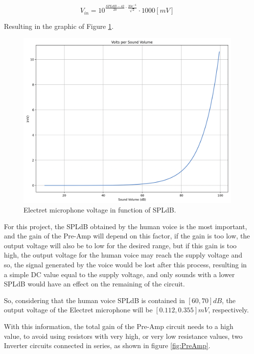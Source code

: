 \begin{equation}
    V_{in} = 10^{\frac{SPLdB-42}{20} \cdot \frac{20e^{-6}}{\sqrt{2}} } \cdot 1000 [mV]
    \label{eq:VoltageSPLdB}
\end{equation}

Resulting in the graphic of Figure \ref{fig:GraphSPLdB}.

\begin{figure}[H]
    \centering
    \includegraphics*[scale = 0.3]{Images/GraphSPLdB.png}
    \caption{Electret microphone voltage in function of SPLdB.}
    \label{fig:GraphSPLdB}
\end{figure}

For this project, the SPLdB obtained by the human voice is the most important, and the gain of the Pre-Amp will depend on this factor, if the gain is too low, the output voltage will also be to low for the desired range, but if this gain is too high, the output voltage for the human voice may reach the supply voltage and so, the signal generated by the voice would be lost after this process, resulting in a simple DC value equal to the supply voltage, and only sounds with a lower SPLdB would have an effect on the remaining of the circuit.

So, considering that the human voice SPLdB is contained in $[60, 70]dB$, the output voltage of the Electret microphone will be $[0.112, 0.355]mV$, respectively.

With this information, the total gain of the Pre-Amp circuit needs to a high value, to avoid using resistors with very high, or very low resistance values, two Inverter circuits connected in series, as shown in figure \ref{fig:PreAmp}.

